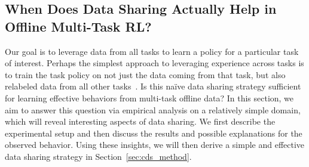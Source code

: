 
\vspace{-0.2cm}
\subsection{When Does Data Sharing Actually Help in Offline Multi-Task RL?}
\label{sec:cds_analysis}
\vspace{-0.2cm}

Our goal is to leverage data from all tasks to learn a policy for a particular task of interest. Perhaps the simplest approach to leveraging experience across tasks is to train the task policy on not just the data coming from that task, but also relabeled data from all other tasks~\citep{caruana1997multitask}. Is this na\"ive data sharing strategy sufficient for learning effective behaviors from multi-task offline data? In this section, we aim to answer this question via empirical analysis on a relatively simple domain, which will reveal interesting aspects of data sharing. We first describe the experimental setup and then discuss the results and possible explanations for the observed behavior. Using these insights, we will then derive a simple and effective data sharing strategy in Section~\ref{sec:cds_method}.

